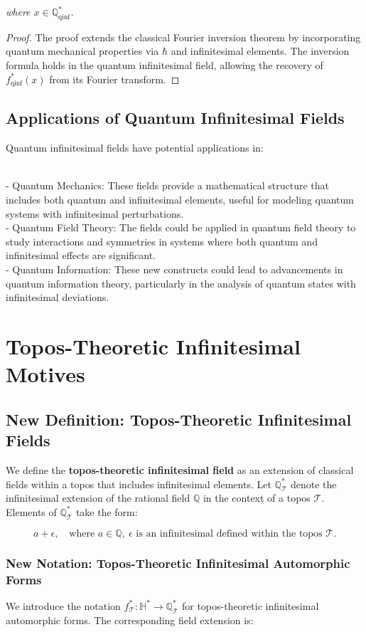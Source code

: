 \documentclass{article}
\begin{document}
\textit{where \(x \in \mathbb{Q}_{\text{qinf}}^*\).}

\begin{proof}
The proof extends the classical Fourier inversion theorem by incorporating quantum mechanical properties via \(\hbar\) and infinitesimal elements. The inversion formula holds in the quantum infinitesimal field, allowing the recovery of \(f_{\text{qinf}}^*(x)\) from its Fourier transform.
\end{proof}

\subsection{Applications of Quantum Infinitesimal Fields}
Quantum infinitesimal fields have potential applications in:

{\ }\\
- Quantum Mechanics: These fields provide a mathematical structure that includes both quantum and infinitesimal elements, useful for modeling quantum systems with infinitesimal perturbations.
{\ }\\
- Quantum Field Theory: The fields could be applied in quantum field theory to study interactions and symmetries in systems where both quantum and infinitesimal effects are significant.
{\ }\\
- Quantum Information: These new constructs could lead to advancements in quantum information theory, particularly in the analysis of quantum states with infinitesimal deviations.

\section{Topos-Theoretic Infinitesimal Motives}
\subsection{New Definition: Topos-Theoretic Infinitesimal Fields}
We define the \textbf{topos-theoretic infinitesimal field} as an extension of classical fields within a topos that includes infinitesimal elements. Let \(\mathbb{Q}_{\mathcal{T}}^*\) denote the infinitesimal extension of the rational field \(\mathbb{Q}\) in the context of a topos \(\mathcal{T}\). Elements of \(\mathbb{Q}_{\mathcal{T}}^*\) take the form:

\[
a + \epsilon, \quad \text{where } a \in \mathbb{Q}, \ \epsilon \text{ is an infinitesimal defined within the topos } \mathcal{T}.
\]

\subsubsection{New Notation: Topos-Theoretic Infinitesimal Automorphic Forms}
We introduce the notation \(f_{\mathcal{T}}^*: \mathbb{H}^* \to \mathbb{Q}_{\mathcal{T}}^*\) for topos-theoretic infinitesimal automorphic forms. The corresponding field extension is:
\end{document}
